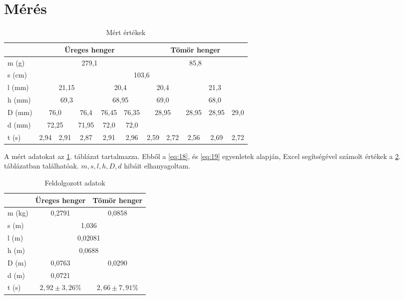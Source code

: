 \documentclass[twoside]{article}
\begin{document}
\section{Mérés}
	\begin{table}\caption{Mért értékek}\label{table:1}
		\centering
		\begin{tabular}{|l|c|c|c|c|c|c|c|c|c|c|}
			\hline
			&\multicolumn{5}{|c|}{Üreges henger}&\multicolumn{5}{|c|}{Tömör henger}\\\hline
			m (g)&\multicolumn{5}{c|}{279,1}&\multicolumn{5}{c|}{85,8}\\\hline
			s (cm)&\multicolumn{10}{c|}{103,6}\\\hline
			l (mm)&\multicolumn{3}{c|}{21,15}&\multicolumn{2}{c|}{20,4}&
			\multicolumn{2}{c|}{20,4}&\multicolumn{3}{c|}{21,3}\\\hline
			h (mm)&\multicolumn{3}{c|}{69,3}&\multicolumn{2}{c|}{68,95}&
			\multicolumn{2}{c|}{69,0}&\multicolumn{3}{c|}{68,0}\\\hline
			D (mm) &\multicolumn{2}{c|}{76,0}&76,4&76,45&76,35&
			\multicolumn{2}{c|}{28,95}&28,95&28,95&29,0\\\hline
			d (mm) &\multicolumn{2}{c|}{72,25}&71,95&72,0&72,0&
			\multicolumn{5}{c|}{}\\\hline
			t (s)&2,94&2,91&2,87&2,91&2,96&
			2,59&2,72&2,56&2,69&2,72\\\hline
		\end{tabular}
	\end{table}
	A mért adatokat az \ref{table:1}. táblázat tartalmazza. Ebből a \eqref{eq:18}, és \eqref{eq:19} egyenletek alapján, Excel segítségével számolt értékek a \ref{table:2}. táblázatban találhatóak. $m, s, l, h, D, d$ hibáit elhanyagoltam.
		\begin{table}\caption{Feldolgozott adatok}\label{table:2}
		\centering
		\begin{tabular}{|l|c|c|}
			\hline
			&Üreges henger&Tömör henger\\\hline
			m (kg)&0,2791&0,0858\\\hline
			s (m)&\multicolumn{2}{c|}{1,036}\\\hline
			l (m)&\multicolumn{2}{c|}{0,02081}\\\hline
			h (m)&\multicolumn{2}{c|}{0,0688}\\\hline
			D (m)&0,0763&0,0290\\\hline
			d (m)&0,0721&\\\hline
			t (s)&$2,92\pm3,26\%$&$2,66\pm7,91\%$\\\hline
		\end{tabular}
	\end{table}
	
\end{document}
